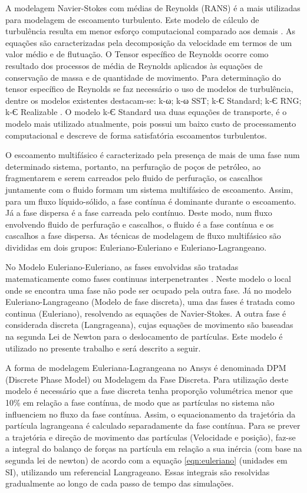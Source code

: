 A modelagem Navier-Stokes com médias de Reynolds (RANS) é a mais utilizadas para modelagem de escoamento turbulento. Este modelo de cálculo de turbulência resulta em menor esforço computacional comparado aos demais \cite{versteeg}. As equações são caracterizadas pela decomposição da velocidade em termos de um valor médio e de flutuação. O Tensor específico de Reynolds ocorre como resultado dos processos de média de Reynolds aplicados às equações de conservação de massa e de quantidade de movimento. Para determinação do tensor específico de Reynolds se faz necessário o uso de modelos de turbulência, dentre os modelos existentes destacam-se:  k-ω; k-ω SST; k-Є Standard; k-Є RNG; k-Є Realizable \cite{versteeg}. O modelo k-Є Standard usa duas equações de transporte,  é o modelo mais utilizado atualmente, pois possui um baixo custo de processamento computacional e descreve de forma satisfatória escoamentos turbulentos.

O escoamento multifásico é caracterizado pela presença de mais de uma fase num determinado sistema, portanto, na perfuração de poços de petróleo, ao fragmentarem e serem carreados pelo fluido de perfuração, os cascalhos juntamente com o fluido formam um sistema multifásico de escoamento. Assim, para um fluxo líquido-sólido, a fase contínua é dominante durante o escoamento. Já a fase dispersa é a fase carreada pelo contínuo. Deste modo, num fluxo envolvendo fluido de perfuração e cascalhos, o fluido é a fase contínua e os cascalhos a fase dispersa.  As técnicas de modelagem de fluxo multifásico são divididas em dois grupos: Euleriano-Euleriano e Euleriano-Lagrangeano.

No Modelo Euleriano-Euleriano, as fases envolvidas são tratadas matematicamente como fases continuas interpenetrantes \cite{ansys}. Neste modelo o local onde se encontra uma fase não pode ser ocupado pela outra fase. Já no modelo Euleriano-Langrageano (Modelo de fase discreta), uma das fases é tratada como continua (Euleriano), resolvendo as equações de Navier-Stokes. A outra fase é considerada discreta (Langrageana), cujas equações de movimento são baseadas na segunda Lei de Newton para o deslocamento de partículas. Este modelo é utilizado no presente trabalho e será descrito a seguir.

A forma de modelagem Euleriana-Lagrangeana no Ansys é denominada DPM (Discrete Phase Model) ou Modelagem da Fase Discreta. Para utilização deste modelo é necessário que a fase discreta tenha proporção volumétrica menor que 10\% em relação a fase contínua, de modo que as partículas no sistema não influenciem no fluxo da fase contínua. Assim, o equacionamento da trajetória da partícula lagrangeana é calculado separadamente da fase contínua. Para se prever a trajetória e direção de movimento das partículas (Velocidade e posição), faz-se a integral do balanço de forças na partícula em relação a sua inércia (com base na segunda lei de newton) de acordo com a equação \ref{eqn:euleriano} (unidades em SI), utilizando um referencial Langrageano. Essas integrais são resolvidas gradualmente ao longo de cada passo de tempo das simulações.

